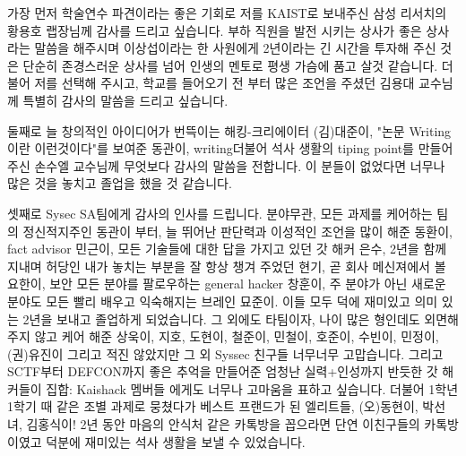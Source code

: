 \documentclass[master,english,final,pdfdoc]{kaist-ucs-improved}
\begin{document}
		
		
		
		
		
		
		
		




{\footnotesize
	
}


\iffinal
	\acknowledgment[4]
	가장 먼저 학술연수 파견이라는 좋은 기회로 저를 KAIST로 보내주신 삼성 리서치의 황용호 랩장님께 감사를 드리고 싶습니다. 부하 직원을 발전 시키는 상사가 좋은 상사라는 말씀을 해주시며 이상섭이라는 한 사원에게 2년이라는 긴 시간을 투자해 주신 것은 단순히 존경스러운 상사를 넘어 인생의 멘토로 평생 가슴에 품고 살것 같습니다. 
	더불어 저를 선택해 주시고, 학교를 들어오기 전 부터 많은 조언을 주셨던 김용대 교수님께 특별히 감사의 말씀을 드리고 싶습니다. 
	
	둘째로 늘 창의적인 아이디어가 번뜩이는 해킹-크리에이터 (김)대준이, "논문 Writing이란 이런것이다"를 보여준 동관이, writing더불어 석사 생활의 tiping point를 만들어주신 손수엘 교수님께 무엇보다 감사의 말씀을 전합니다. 이 분들이 없었다면 너무나 많은 것을 놓치고 졸업을 했을 것 같습니다. 

	셋째로 Sysec SA팀에게 감사의 인사를 드립니다. 분야무관, 모든 과제를 케어하는 팀의 정신적지주인 동관이 부터, 늘 뛰어난 판단력과 이성적인 조언을 많이 해준 동환이, fact advisor 민근이, 모든 기술들에 대한 답을 가지고 있던 갓 해커 은수, 2년을 함께 지내며 허당인 내가 놓치는 부분을 잘 항상 챙겨 주었던 현기, 곧 회사 메신져에서 볼 요한이, 보안 모든 분야를 팔로우하는 general hacker 창훈이, 주 분야가 아닌 새로운 분야도 모든 빨리 배우고 익숙해지는 브레인 묘준이. 이들 모두 덕에 재미있고 의미 있는 2년을 보내고 졸업하게 되었습니다. 
	그 외에도 타팀이자, 나이 많은 형인데도 외면해 주지 않고 케어 해준 상욱이, 지호, 도현이, 철준이, 민철이, 호준이, 수빈이, 민정이, (권)유진이 그리고 적진 않았지만 그 외 Syssec 친구들 너무너무 고맙습니다.
	그리고 SCTF부터 DEFCON까지 좋은 추억을 만들어준 엄청난 실력+인성까지 반듯한 갓 해커들이 집합: Kaishack 멤버들 에게도 너무나 고마움을 표하고 싶습니다.
	더불어 1학년 1학기 때 같은 조별 과제로 뭉쳤다가 베스트 프랜드가 된 엘리트들, (오)동현이, 박선녀, 김홍식이! 2년 동안 마음의 안식처 같은 카톡방을 꼽으라면 단연 이친구들의 카톡방이였고 덕분에 재미있는 석사 생활을 보낼 수 있었습니다.
\end{document}
